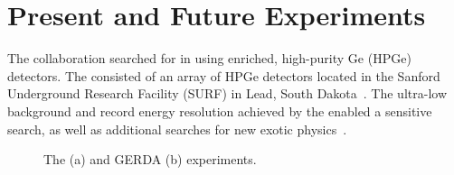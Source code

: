 \section{Present and Future Experiments} \label{sec:experiments}

The {\MJMit} collaboration searched for \novbb{} in \geEn{} using enriched, high-purity Ge (HPGe) detectors. The {\MJDEMit} consisted of an array of HPGe detectors located in the Sanford Underground Research Facility (SURF) in Lead, South Dakota~\cite{mjd}. The ultra-low background and record energy resolution achieved by the {\DEMit} enabled a sensitive \novbb{} search, as well as additional searches for new exotic physics~\cite{mjd_axions, mjd_trinucleon,mjd_waveform}.
\begin{figure}[htb]
	\centering
	\caption{ The {\MJDEMit} (a) and GERDA (b) experiments.} 
	\label{fig:experiments}
\end{figure}

